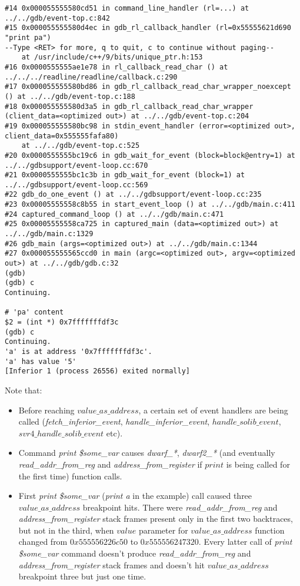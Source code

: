 \documentclass{report}
\begin{document}
\begin{verbatim}
#14 0x000055555580cd51 in command_line_handler (rl=...) at ../../gdb/event-top.c:842
#15 0x000055555580d4ec in gdb_rl_callback_handler (rl=0x55555621d690 "print pa")
--Type <RET> for more, q to quit, c to continue without paging--
    at /usr/include/c++/9/bits/unique_ptr.h:153
#16 0x0000555555ae1e78 in rl_callback_read_char () at ../../../readline/readline/callback.c:290
#17 0x000055555580bd86 in gdb_rl_callback_read_char_wrapper_noexcept () at ../../gdb/event-top.c:188
#18 0x000055555580d3a5 in gdb_rl_callback_read_char_wrapper (client_data=<optimized out>) at ../../gdb/event-top.c:204
#19 0x000055555580bc98 in stdin_event_handler (error=<optimized out>, client_data=0x555555fafa80)
    at ../../gdb/event-top.c:525
#20 0x0000555555bc19c6 in gdb_wait_for_event (block=block@entry=1) at ../../gdbsupport/event-loop.cc:670
#21 0x0000555555bc1c3b in gdb_wait_for_event (block=1) at ../../gdbsupport/event-loop.cc:569
#22 gdb_do_one_event () at ../../gdbsupport/event-loop.cc:235
#23 0x00005555558c8b55 in start_event_loop () at ../../gdb/main.c:411
#24 captured_command_loop () at ../../gdb/main.c:471
#25 0x00005555558ca725 in captured_main (data=<optimized out>) at ../../gdb/main.c:1329
#26 gdb_main (args=<optimized out>) at ../../gdb/main.c:1344
#27 0x000055555565ccd0 in main (argc=<optimized out>, argv=<optimized out>) at ../../gdb/gdb.c:32
(gdb) 
(gdb) c
Continuing.

# 'pa' content
$2 = (int *) 0x7fffffffdf3c
(gdb) c
Continuing.
'a' is at address '0x7fffffffdf3c'.
'a' has value '5'
[Inferior 1 (process 26556) exited normally] 
\end{verbatim}
Note that:
\begin{itemize}
\item Before reaching  $value\_as\_address$, a certain set of event handlers are being called (\textit{fetch\_inferior\_event}, \textit{handle\_inferior\_event}, $handle\_solib\_event$, $svr4\_handle\_solib\_event$ etc). 
\item Command \textit{print \$some\_var} causes \textit{dwarf\_*}, \textit{dwarf2\_*} (and eventually \textit{read\_addr\_from\_reg} and \textit{address\_from\_register} if $print$ is being called for the first time) function calls.
\item First \textit{print \$some\_var} (\textit{print a} in the example) call caused three $value\_as\_address$ breakpoint hits. There were \textit{read\_addr\_from\_reg} and \textit{address\_from\_register} stack frames present only in the first two backtraces, but not in the third, when $value$ parameter for $value\_as\_address$ function changed from $0x555556226c50$ to $0x555556247320$.
Every latter call of \textit{print \$some\_var} command doesn't produce \textit{read\_addr\_from\_reg} and \textit{address\_from\_register} stack frames and doesn't hit $value\_as\_address$ breakpoint three but just one time.
\end{itemize}
\end{document}
